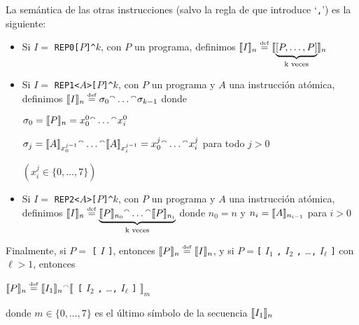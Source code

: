 La semántica de las otras instrucciones (salvo la regla de que introduce `\verb#,#') es la siguiente:
\begin{itemize}
\item Si $I=$ \verb#REP0[#$P$\verb#]^#$k$, con $P$ un programa, 
definimos 
$\llbracket I\rrbracket_n \stackrel{\scriptscriptstyle \mathrm{def}}{=} \llbracket \underbrace{[P,\dots,P]}_\text{k veces}\rrbracket_n $


\item Si $I=$ \verb#REP1<#$A$\verb#>[#$P$\verb#]^#$k$, con $P$ un programa y $A$ una instrucción atómica, 
definimos 
$\llbracket I\rrbracket_n \stackrel{\scriptscriptstyle \mathrm{def}}{=}  \sigma_0 {}^\smallfrown \dots {}^\smallfrown \sigma_{k-1}$ donde
      
      $\sigma_0 = \llbracket P\rrbracket_n = x_0^0 {}^\smallfrown \dots {}^\smallfrown x_i^0$
      
      $\sigma_j = \llbracket A\rrbracket_{x_0^{j-1}} {}^\smallfrown \dots {}^\smallfrown \llbracket A\rrbracket_{x_i^{j-1}} = x_0^j {}^\smallfrown \dots {}^\smallfrown x_i^j$ para todo $j>0$ 
      
      $(x_i^j \in\{0,\dots,7\})$

\item Si $I=$ \verb#REP2<#$A$\verb#>[#$P$\verb#]^#$k$, con $P$ un programa y $A$ una instrucción atómica, 
definimos 
$\llbracket I\rrbracket_n \stackrel{\scriptscriptstyle \mathrm{def}}{=} \underbrace{\llbracket P\rrbracket_{n_0} {}^\smallfrown \dots {}^\smallfrown \llbracket P\rrbracket_{n_i}}_\text{k veces}$ donde $n_0 = n$ y $n_i = \llbracket A\rrbracket_{n_{i-1}}$ para $i>0$ 
\end{itemize}

Finalmente, si $P=$ \verb#[# $I$ \verb#]#, entonces $\llbracket P\rrbracket_n\stackrel{\scriptscriptstyle \mathrm{def}}{=}\llbracket I\rrbracket_n$, 
y si $P=$\verb#[# $I_1$ \verb#,# $I_2$ \verb#,# \dots \verb#,# $I_\ell$ \verb#]# con $\ell>1$, entonces

\begin{center}
$\llbracket P\rrbracket_n \stackrel{\scriptscriptstyle \mathrm{def}}{=} \llbracket I_1\rrbracket_n {}^\smallfrown \llbracket$
\verb#[# $I_2$ \verb#,# \dots \verb#,# $I_\ell$ \verb#]#
$\rrbracket_m$
\end{center}

\noindent donde $m\in\{0,\dots,7\}$ es el último símbolo de la secuencia $\llbracket I_1\rrbracket_n$ 


